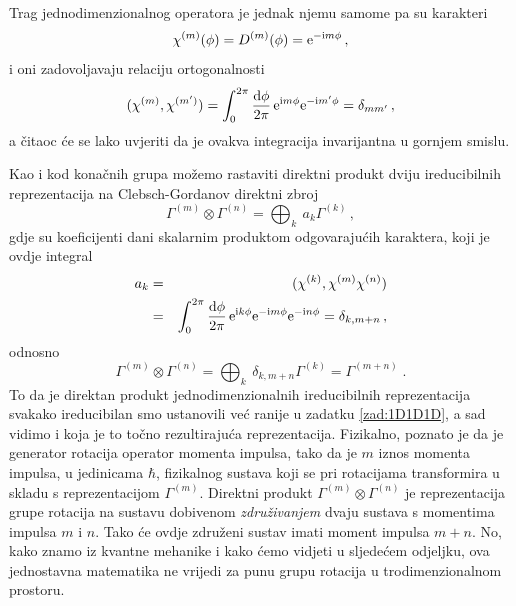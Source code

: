 Trag jednodimenzionalnog operatora je jednak njemu samome pa su
karakteri 
\begin{equation}
\chi^{(m)}(\phi)=D^{(m)}(\phi)=\textrm{e}^{-\textrm{\scriptsize i} m \phi} \,,
\end{equation}
i oni zadovoljavaju relaciju ortogonalnosti
\begin{displaymath}
(\chi^{(m)}, \chi^{(m')})=\int_{0}^{2\pi}\frac{\textrm{d} \phi}{2\pi}\,
 \textrm{e}^{\textrm{\scriptsize i} m \phi}\textrm{e}^{-\textrm{\scriptsize i} m' \phi} = \delta_{mm'} \,,
\end{displaymath}
a čitaoc će se lako uvjeriti da je ovakva integracija invarijantna u gornjem smislu.

Kao i kod konačnih grupa možemo rastaviti direktni produkt dviju
ireducibilnih reprezentacija na Clebsch-Gordanov direktni zbroj 
\begin{displaymath}
  \Gamma^{(m)}\otimes\Gamma^{(n)} =
  \bigoplus_{k}\: a_{k}\Gamma^{(k)}  \,,
\end{displaymath}
gdje su koeficijenti dani skalarnim produktom odgovarajućih karaktera,
koji je ovdje integral
\begin{eqnarray*}
a_{k} & = & (\chi^{(k)}, \chi^{(m)}\chi^{(n)}) \\
      & = & \int_{0}^{2\pi}\frac{\textrm{d} \phi}{2\pi}\,
    \textrm{e}^{\textrm{\scriptsize i} k \phi}\textrm{e}^{-\textrm{\scriptsize i} m \phi}\textrm{e}^{-\textrm{\scriptsize i} n \phi} = \delta_{k,m+n} \,,
\end{eqnarray*}
odnosno
\begin{displaymath}
  \Gamma^{(m)}\otimes\Gamma^{(n)} =
  \bigoplus_{k}\: \delta_{k,m+n}\Gamma^{(k)} = \Gamma^{(m+n)} \;.
\end{displaymath}
To da je direktan produkt jednodimenzionalnih ireducibilnih reprezentacija svakako
ireducibilan smo ustanovili već ranije u zadatku \ref{zad:1D1D1D}, a sad vidimo i koja je
to točno rezultirajuća reprezentacija. Fizikalno, poznato je da je generator
rotacija operator momenta impulsa, tako da je $m$ iznos momenta impulsa,
u jedinicama $\hbar$, fizikalnog sustava koji se pri rotacijama transformira
u skladu s reprezentacijom $\Gamma^{(m)}$. Direktni produkt $\Gamma^{(m)}\otimes\Gamma^{(n)}$
je reprezentacija grupe rotacija na sustavu dobivenom \emph{združivanjem} dvaju sustava 
s momentima impulsa $m$ i $n$. Tako će ovdje združeni sustav imati moment impulsa $m+n$.
No, kako znamo iz kvantne mehanike i kako ćemo vidjeti u sljedećem odjeljku, ova
jednostavna matematika ne vrijedi za punu grupu rotacija u trodimenzionalnom prostoru.


